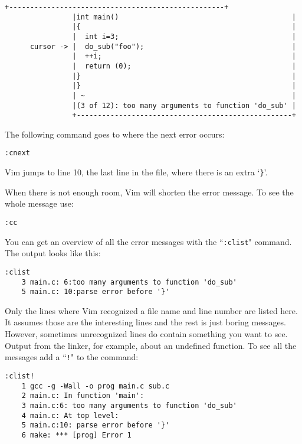 \begin{Verbatim}[samepage=true]
                +---------------------------------------------------+
                |int main()                                         |
                |{                                                  |
                |  int i=3;                                         |
      cursor -> |  do_sub("foo");                                   |
                |  ++i;                                             |
                |  return (0);                                      |
                |}                                                  |
                |}                                                  |
                | ~                                                 |
                |(3 of 12): too many arguments to function 'do_sub' |
                +---------------------------------------------------+
\end{Verbatim}

The following command goes to where the next error occurs:

\begin{Verbatim}[samepage=true]
 :cnext
\end{Verbatim}

Vim jumps to line 10, the last line in the file, where there is an extra `\texttt{\}}'.

When there is not enough room, Vim will shorten the error message.
To see the whole message use:

\begin{Verbatim}[samepage=true]
 :cc
\end{Verbatim}

You can get an overview of all the error messages with the ``\texttt{:clist}" command.
The output looks like this:

\begin{Verbatim}[samepage=true]
 :clist
    3 main.c: 6:too many arguments to function 'do_sub'
    5 main.c: 10:parse error before '}'
\end{Verbatim}

Only the lines where Vim recognized a file name and line number are listed here.
It assumes those are the interesting lines and the rest is just boring messages.
However, sometimes unrecognized lines do contain something you want to see.
Output from the linker, for example, about an undefined function.
To see all the messages add a ``\texttt{!}" to the command:

\begin{Verbatim}[samepage=true]
 :clist!
    1 gcc -g -Wall -o prog main.c sub.c
    2 main.c: In function 'main':
    3 main.c:6: too many arguments to function 'do_sub'
    4 main.c: At top level:
    5 main.c:10: parse error before '}'
    6 make: *** [prog] Error 1
\end{Verbatim}


